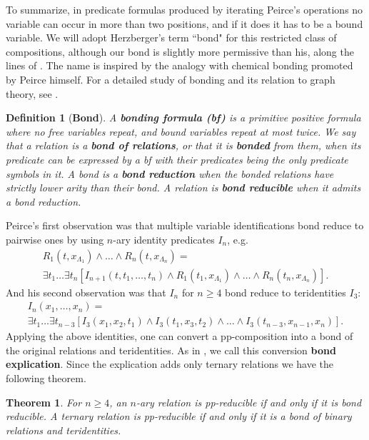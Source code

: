 \documentclass[11pt]{article}
\theoremstyle{plain}
\newtheorem{theorem}{Theorem}
\newtheorem{definition}{Definition}
\theoremstyle{definition}
\def\L{\Lambda}
\begin{document}
To summarize, in predicate formulas produced by iterating Peirce's operations no variable can occur in more than two positions, and if it does it has to be a bound variable. We will adopt Herzberger's term ``bond" for this restricted class of compositions, although our bond is slightly more permissive than his, along the lines of \cite{HerPos04}. The name is inspired by the analogy with chemical bonding promoted by Peirce himself. For a detailed study of bonding and its relation to graph theory, see \cite{Kosh23}. 
\begin{definition}[{\bf Bond}]\label{BondDef}
A {\bf bonding formula (bf)} is a primitive positive formula where no free variables repeat, and bound variables repeat at most twice. We say that a relation is a {\bf bond of relations}, or that it is {\bf bonded} from them, when its predicate can be expressed by a bf with their predicates being the only predicate symbols in it. A bond is a {\bf bond reduction} when the bonded relations have strictly lower arity than their bond. A relation is {\bf bond reducible} when it admits a bond reduction.
\end{definition}
Peirce's first observation was that multiple variable identifications bond reduce to pairwise ones by using $n$-ary identity predicates $I_n$, e.g.
\begin{multline}\label{multiidn}
R_1(t,x_{\L_1})\land\dots\land R_n(t,x_{\L_n})=\\
\exists t_1\dots\exists t_n\left[I_{n+1}(t,t_1,\dots,t_n)\land R_1(t_1,x_{\L_1})\land\dots\land R_n(t_n,x_{\L_n})\right].
\end{multline}
And his second observation was that $I_n$ for $n\geq4$ bond reduce to teridentities $I_3$: 
\begin{multline}\label{InviaI3}
I_{n}(x_1,\dots,x_n)=\\
\exists t_1\dots\exists t_{n-3}\left[I_3(x_1,x_2,t_1)\land I_3(t_1,x_3,t_2)\land\dots\land I_3(t_{n-3},x_{n-1},x_n)\right].
\end{multline}
Applying the above identities, one can convert a pp-composition into a bond of the original relations and teridentities. As in \cite{Kosh22,Kosh23}, we call this conversion {\bf bond explication}. Since the explication adds only ternary relations we have the following theorem.
\begin{theorem}\label{Comp2Bond} 
For $n\geq4$, an $n$-ary relation is pp-reducible if and only if it is bond reducible. A ternary relation is pp-reducible if and only if it is a bond of binary relations and teridentities.
\end{theorem}
\end{document}
